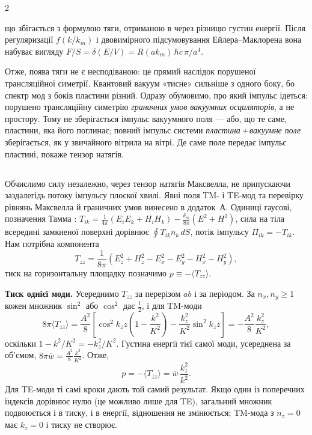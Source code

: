 \documentclass[twoside, 10pt]{article}
\def\myvspacebeforesubsection{-2.0mm}
\def\myvspaceaftersubsection{-2.5mm}
\begin{document}
\begin{multicols}{2}

що збігається з формулою тяги, отриманою в \cite{Drozdov2024} через різницю густин енергії. Після
регуляризації \(f(k/k_m)\) і двовимірного підсумовування Ейлера--Маклорена вона набуває вигляду
\(F/S=\delta(E/V)=R(ak_m)\,\hbar c\,\pi/a^4\).

Отже, поява тяги не є несподіваною: це прямий наслідок порушеної трансляційної симетрії. Квантовий
вакуум «тисне» сильніше з одного боку, бо спектр мод з боків пластини різний. Одразу обумовимо,
про який імпульс ідеться: порушено трансляційну симетрію \emph{граничних умов вакуумних осциляторів}, а не простору. Тому не зберігається імпульс вакуумного поля --- або, що те саме, пластини, яка його поглинає; повний імпульс системи \emph{пластина\,+\,вакуумне поле} зберігається, як у звичайного вітрила на вітрі. Де
саме поле передає імпульс пластині, покаже тензор натягів.

\vspace{\myvspacebeforesubsection}
\subsection*{}
\vspace{\myvspaceaftersubsection}


Обчислимо силу незалежно, через тензор натягів Максвелла, не припускаючи заздалегідь потоку
імпульсу плоскої хвилі. Явні поля TM- і TE-мод та перевірку рівнянь Максвелла й граничних умов
винесено в додаток~А. Одиниці гаусові, позначення Тамма \cite{Tamm1957}:
\(T_{ik}=\frac1{4\pi}(E_iE_k+H_iH_k)-\frac{\delta_{ik}}{8\pi}(E^2+H^2)\), сила на тіла всередині
замкненої поверхні дорівнює \(\oint T_{ik}n_k\,dS\), потік імпульсу \(\Pi_{ik}=-T_{ik}\). Нам
потрібна компонента
\[
T_{zz}=\frac1{8\pi}\left(E_z^2+H_z^2-E_x^2-E_y^2-H_x^2-H_y^2\right),
\]
тиск на горизонтальну площадку позначимо \(p\equiv-\langle T_{zz}\rangle\).

\textbf{Тиск однієї моди.} Усереднимо \(T_{zz}\) за перерізом \(ab\) і за періодом. За
\(n_x,n_y\ge1\) кожен множник \(\sin^2\) або \(\cos^2\) дає \(\tfrac12\), і для TM-моди
\[
8\pi\langle T_{zz}\rangle=\frac{A^2}{8}\left[\cos^2k_zz\left(1-\frac{k^2}{K^2}\right)-\frac{k_z^2}{K^2}\sin^2k_zz\right]
=-\frac{A^2}{8}\frac{k_z^2}{K^2},
\]
оскільки \(1-k^2/K^2=-k_z^2/K^2\). Густина енергії тієї самої моди, усереднена за об'ємом,
\(8\pi\overline w=\frac{A^2}{8}\frac{k^2}{K^2}\). Отже,
\[
p=-\langle T_{zz}\rangle=\overline w\,\frac{k_z^2}{k^2}.
\]
Для TE-моди ті самі кроки дають той самий результат. Якщо один із поперечних індексів дорівнює
нулю (це можливо лише для TE), загальний множник подвоюється і в тиску, і в енергії, відношення не
змінюється; TM-мода з \(n_z=0\) має \(k_z=0\) і тиску не створює.


\end{multicols}
\end{document}
